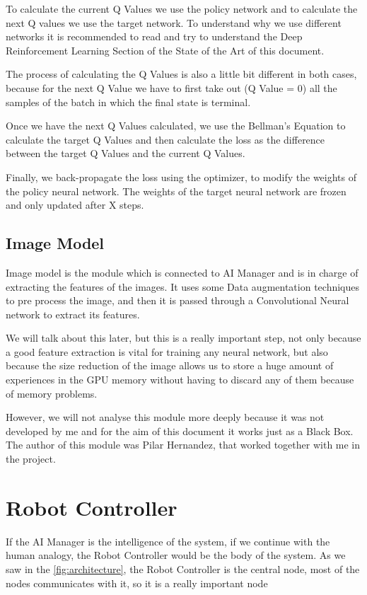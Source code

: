 				To calculate the current Q Values we use the policy network and to calculate the next Q values we use the target network. To understand why we use different networks it is recommended to read and try to understand the Deep Reinforcement Learning Section of the State of the Art of this document.
				
				The process of calculating the Q Values is also a little bit different in both cases, because for the next Q Value we have to first take out (Q Value = 0) all the samples of the batch in which the final state is terminal.
				
				Once we have the next Q Values calculated, we use the Bellman's Equation to calculate the target Q Values and then calculate the loss as the difference between the target Q Values and the current Q Values.
				
				Finally, we back-propagate the loss using the optimizer, to modify the weights of the policy neural network. The weights of the target neural network are frozen and only updated after X steps.
				
		\subsection{Image Model}
		
			Image model is the module which is connected to AI Manager and is in charge of extracting the features of the images. It uses some Data augmentation techniques to pre process the image, and then it is passed through a Convolutional Neural network to extract its features.
			
			We will talk about this later, but this is a really important step, not only because a good feature extraction is vital for training any neural network, but also because the size reduction of the image allows us to store a huge amount of experiences in the GPU memory without having to discard any of them because of memory problems.
			
			However, we will not analyse this module more deeply because it was not developed by me and for the aim of this document it works just as a Black Box. The author of this module was Pilar Hernandez, that worked together with me in the project.
				
	\section{Robot Controller}
		
		If the AI Manager is the intelligence of the system, if we continue with the human analogy, the Robot Controller would be the body of the system. As we saw in the \autoref{fig:architecture}, the Robot Controller is the central node, most of the nodes communicates with it, so it is a really important node
		
